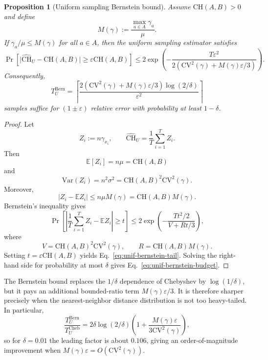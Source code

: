 \documentclass[conference]{IEEEtran}
\newtheorem{proposition}{Proposition}
\begin{document}
\begin{proposition}[Uniform sampling Bernstein bound]
\label{prop:unif-bernstein}
Assume $\mathrm{CH}(A,B)>0$ and define
\[
    M(\gamma) := \frac{\max_{a \in A}\gamma_a}{\mu}.
\]
If $\gamma_a/\mu \leq M(\gamma)$ for all $a \in A$, then the uniform
sampling estimator satisfies
\begin{equation}
    \Pr\!\left[
        \big|\widehat{\mathrm{CH}}_U-\mathrm{CH}(A,B)\big|
        \geq \varepsilon \mathrm{CH}(A,B)
    \right]
    \leq
    2\exp\!\left(
        -\frac{
            T\varepsilon^2
        }{
            2\left(\mathrm{CV}^2(\gamma)+M(\gamma)\varepsilon/3\right)
        }
    \right).
\label{eq:unif-bernstein-tail}
\end{equation}
Consequently,
\begin{equation}
    T_U^{\mathrm{Bern}}
    =
    \left\lceil
        \frac{
            2\left(\mathrm{CV}^2(\gamma)+M(\gamma)\varepsilon/3\right)
            \log(2/\delta)
        }{
            \varepsilon^2
        }
    \right\rceil
\label{eq:unif-bernstein-budget}
\end{equation}
samples suffice for $(1\pm\varepsilon)$ relative error with probability
at least $1-\delta$.
\end{proposition}

\begin{proof}
Let
\[
    Z_i := n\gamma_{x_i},
    \qquad
    \widehat{\mathrm{CH}}_U = \frac{1}{T}\sum_{i=1}^T Z_i .
\]
Then
\[
    \mathbb{E}[Z_i] = n\mu = \mathrm{CH}(A,B)
\]
and
\[
    \mathrm{Var}(Z_i)
    =
    n^2\sigma^2
    =
    \mathrm{CH}(A,B)^2\mathrm{CV}^2(\gamma).
\]
Moreover,
\[
    |Z_i-\mathbb{E}Z_i|
    \leq
    n\mu M(\gamma)
    =
    \mathrm{CH}(A,B)M(\gamma).
\]
Bernstein's inequality gives
\[
\Pr\!\left[
    \left|
    \frac{1}{T}\sum_{i=1}^{T}Z_i-\mathbb{E}Z_i
    \right|
    \geq t
\right]
\leq
2\exp\!\left(
    -\frac{Tt^2/2}{V+Rt/3}
\right),
\]
where
\[
    V=\mathrm{CH}(A,B)^2\mathrm{CV}^2(\gamma),
    \qquad
    R=\mathrm{CH}(A,B)M(\gamma).
\]
Setting $t=\varepsilon\mathrm{CH}(A,B)$ yields
Eq.~\ref{eq:unif-bernstein-tail}. Solving the right-hand side
for probability at most $\delta$ gives
Eq.~\ref{eq:unif-bernstein-budget}.
\end{proof}

The Bernstein bound replaces the $1/\delta$ dependence of Chebyshev
by $\log(1/\delta)$, but it pays an additional bounded-ratio term
$M(\gamma)\varepsilon/3$. It is therefore sharper precisely when the
nearest-neighbor distance distribution is not too heavy-tailed. In
particular,
\[
\frac{
    T_U^{\mathrm{Bern}}
}{
    T_U^{\mathrm{Cheb}}
}
=
2\delta\log(2/\delta)
\left(
    1+
    \frac{M(\gamma)\varepsilon}{3\mathrm{CV}^2(\gamma)}
\right),
\]
so for $\delta=0.01$ the leading factor is about $0.106$, giving an
order-of-magnitude improvement when
$M(\gamma)\varepsilon=O(\mathrm{CV}^2(\gamma))$.
\end{document}
